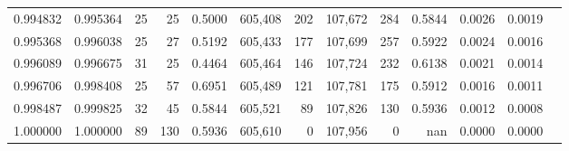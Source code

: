 \begin{tabular}{rrrrrrrrrrrrr}
0.994832 & 0.995364 &    25 &  25 &                                     0.5000 & 605,408 &     202 & 107,672 &     284 & 0.5844 & 0.0026 & 0.0019 \\
0.995368 & 0.996038 &    25 &  27 &                                     0.5192 & 605,433 &     177 & 107,699 &     257 & 0.5922 & 0.0024 & 0.0016 \\
0.996089 & 0.996675 &    31 &  25 &                                     0.4464 & 605,464 &     146 & 107,724 &     232 & 0.6138 & 0.0021 & 0.0014 \\
0.996706 & 0.998408 &    25 &  57 &                                     0.6951 & 605,489 &     121 & 107,781 &     175 & 0.5912 & 0.0016 & 0.0011 \\
0.998487 & 0.999825 &    32 &  45 &                                     0.5844 & 605,521 &      89 & 107,826 &     130 & 0.5936 & 0.0012 & 0.0008 \\
1.000000 & 1.000000 &    89 & 130 &                                     0.5936 & 605,610 &       0 & 107,956 &       0 &    nan & 0.0000 & 0.0000 \\
\bottomrule
\end{tabular}

